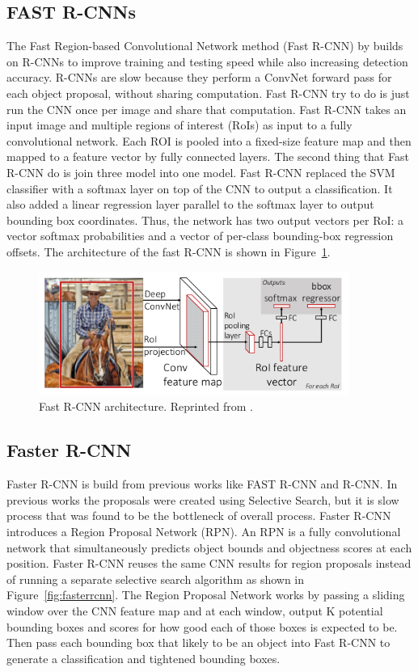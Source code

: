 \subsection{FAST R-CNNs}
The Fast Region-based Convolutional Network method (Fast R-CNN) by  builds on R-CNNs to improve training and testing speed while also increasing detection accuracy. R-CNNs are slow because they perform a ConvNet forward pass for each object proposal, without sharing computation. Fast R-CNN try to do is just run the CNN once per image and share that computation. Fast R-CNN takes an input image and multiple regions of interest (RoIs) as input to a fully convolutional network. Each ROI is pooled into a fixed-size feature map and then mapped to a feature vector by fully connected layers. The second thing that Fast R-CNN do is join three model into one model. Fast R-CNN replaced the SVM classifier with a softmax layer on top of the CNN to output a classification. It also added a linear regression layer parallel to the softmax layer to output bounding box coordinates. Thus, the network has two output vectors per RoI: a vector softmax probabilities and a vector of per-class bounding-box regression offsets. The architecture of the fast R-CNN is shown in Figure~\ref{fig:fastrcnn}. 

\begin{figure}[t]
  \centering
  \includegraphics[width=4in]{figures/fastrcnn.jpg}  
  \caption[FAST R-CNNs]{Fast R-CNN architecture. Reprinted from . }
  \label{fig:fastrcnn}
\end{figure}

\subsection{Faster R-CNN}
Faster R-CNN \cite{ren2015faster} is build from previous works like FAST R-CNN and R-CNN. In previous works the proposals were created using Selective Search, but it is slow process that was found to be the bottleneck of overall process. Faster R-CNN introduces a Region Proposal Network (RPN). An RPN is a fully convolutional network that simultaneously predicts object bounds and objectness scores at each position. Faster R-CNN reuses the same CNN results for region proposals instead of running a separate selective search algorithm as shown in Figure~\ref{fig:fasterrcnn}. The Region Proposal Network works by passing a sliding window over the CNN feature map and at each window, output K potential bounding boxes and scores for how good each of those boxes is expected to be. Then pass each bounding box that likely to be an object into Fast R-CNN to generate a classification and tightened bounding boxes.

